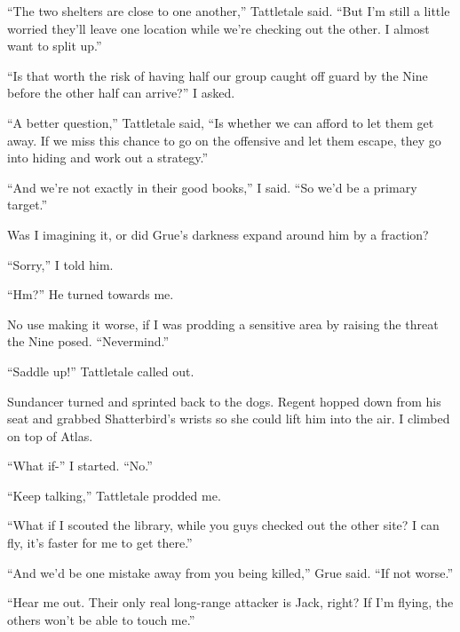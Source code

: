 ``The two shelters are close to one another,'' Tattletale said.  ``But I'm still a little worried they'll leave one location while we're checking out the other.  I almost want to split up.''



``Is that worth the risk of having half our group caught off guard by the Nine before the other half can arrive?''  I asked.



``A better question,'' Tattletale said, ``Is whether we can afford to let them get away.  If we miss this chance to go on the offensive and let them escape, they go into hiding and work out a strategy.''



``And we're not exactly in their good books,'' I said.  ``So we'd be a primary target.''



Was I imagining it, or did Grue's darkness expand around him by a fraction?



``Sorry,'' I told him.



``Hm?''  He turned towards me.



No use making it worse, if I was prodding a sensitive area by raising the threat the Nine posed.  ``Nevermind.''



``Saddle up!''  Tattletale called out.



Sundancer turned and sprinted back to the dogs.  Regent hopped down from his seat and grabbed Shatterbird's wrists so she could lift him into the air.  I climbed on top of Atlas.



``What if-'' I started.  ``No.''



``Keep talking,'' Tattletale prodded me.



``What if I scouted the library, while you guys checked out the other site?  I can fly, it's faster for me to get there.''



``And we'd be one mistake away from you being killed,'' Grue said.  ``If not worse.''



``Hear me out.  Their only real long-range attacker is Jack, right?  If I'm flying, the others won't be able to touch me.''



